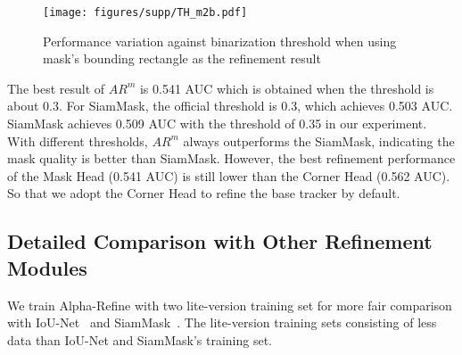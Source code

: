 \documentclass[final]{cvpr}
\begin{document}
{\begin{appendices}
\begin{figure}[!h]
\centering
\texttt{[image: figures/supp/TH\_m2b.pdf]}
\caption{Performance variation against binarization threshold when using mask's bounding rectangle as the refinement result} \label{fig:mask2box}
\end{figure} 

The best result of $AR^{m}$ is 0.541 AUC which is obtained when the threshold is about 0.3. For SiamMask, the official threshold is 0.3, which achieves 0.503 AUC. SiamMask achieves 0.509 AUC  with the threshold of 0.35 in our experiment. With different thresholds, $AR^{m}$ always outperforms the SiamMask, indicating the mask quality is better than SiamMask. However, the best refinement performance of the Mask Head (0.541 AUC) is still lower than the Corner Head (0.562 AUC). So that we adopt the Corner Head to refine the base tracker by default.


\subsection{Detailed Comparison with Other Refinement Modules}

We train Alpha-Refine with two lite-version training set for more fair comparison with IoU-Net~\cite{ATOM,DiMP} and SiamMask~\cite{SiamMask}. The lite-version training sets consisting of less data than IoU-Net and SiamMask's training set.


\begin{table}[!h]
    \centering
    \caption{Comparison with other refinement module on the \textit{LaSOT test} set. 
    ``Base tracker-AR'' represents base tracker with Alpha-Refine. $AR^{m_{0.3}}$ stand for the output of mask head with threshold 0.3 is used as the refinement result.
    The best three results are marked in \textbf{\textcolor[rgb]{1,0,0}{red}}, \textbf{\textcolor[rgb]{0,1,0}{green}} and \textbf{\textcolor[rgb]{0,0,1}{blue}} bold fonts respectively. $\dagger$ and $\ddagger$ indicate Alpha-Refine modules trained with a lite version of training set which intersects with IoUNet's and SiamMask's training set respectively.
    Better viewed in color with zoom-in.}
    \vspace{2mm}
    
\end{table}
\end{appendices}}
\end{document}

